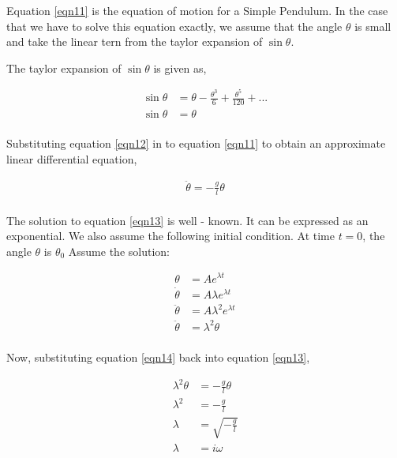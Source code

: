 \documentclass[12pt]{article}
\begin{document}
Equation \ref{eqn11} is the equation of motion for a Simple Pendulum. In the case that we have
to solve this equation exactly, we assume that the angle $\theta$ is small and take the linear tern
from the taylor expansion of $\sin{\theta}$.

The taylor expansion of $\sin{\theta}$ is given as,

\begin{equation} \label{eqn12}
    \begin{split}
       \sin{\theta} &= \theta - \frac{\theta^{3}}{6} + \frac{\theta^{5}}{120} + ... \\
       \sin{\theta} &= \theta \\ 
    \end{split}
\end{equation}

Substituting equation \ref{eqn12} in to equation \ref{eqn11} to obtain an approximate linear differential equation,

\begin{equation} \label{eqn13}
    \begin{split}
        \ddot{\theta} = - \frac{g}{l} \theta \\
    \end{split}
\end{equation}

The solution to equation \ref{eqn13} is well - known. It can be expressed as an exponential. 
We also assume the following initial condition. At time $t = 0$, the angle $\theta$ is 
$ \theta_{0} $ Assume the solution:

\begin{equation} \label{eqn14}
    \begin{split}
        \theta &= A e^{\lambda t} \\
        \dot{\theta} &= A \lambda e^{\lambda t} \\
        \ddot{\theta} &= A \lambda^{2} e^{\lambda t} \\
        \ddot{\theta} &= \lambda^{2} \theta \\
    \end{split}
\end{equation}

\newpage

Now, substituting equation \ref{eqn14} back into equation \ref{eqn13},

\begin{equation} \label{eqn15}
    \begin{split}
        \lambda^{2} \theta &= - \frac{g}{l} \theta  \\
        \lambda^{2} &= - \frac{g}{l} \\
        \lambda &= \sqrt{- \frac{g}{l}} \\
        \lambda &=  i \omega \\
    \end{split}
\end{equation}
\end{document}
